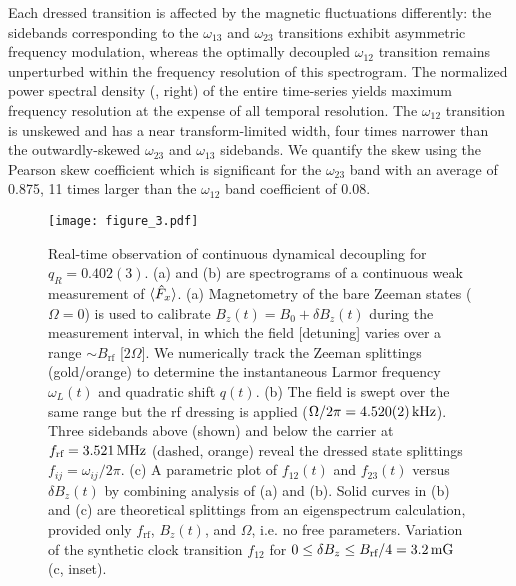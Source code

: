 \documentclass[aps,prl,reprint,superscriptaddress,floatfix]{revtex4-1}
\begin{document}
Each dressed transition is affected by the magnetic fluctuations differently: the sidebands corresponding to the $\omega_{13}$ and $\omega_{23}$ transitions exhibit asymmetric frequency modulation, whereas the optimally decoupled $\omega_{12}$ transition remains unperturbed within the frequency resolution of this spectrogram.
The normalized power spectral density (, right) of the entire time-series yields maximum frequency resolution at the expense of all temporal resolution.
The $\omega_{12}$ transition is unskewed and has a near transform-limited width, four times narrower than the outwardly-skewed $\omega_{23}$ and $\omega_{13}$ sidebands. We quantify the skew using the Pearson skew coefficient which is significant for the $\omega_{23}$ band with an average of 0.875, 11 times larger than the $\omega_{12}$ band coefficient of 0.08. 
\begin{figure}
    \texttt{[image: figure\_3.pdf]}
    \caption{
    \label{fig:acquisition_pipeline}
        Real-time observation of continuous dynamical decoupling for $q_R = 0.402(3)$.
        (a) and (b) are spectrograms of a continuous weak measurement of $\langle \hat{F}_x \rangle$.
        (a) Magnetometry of the bare Zeeman states ($\Omega=0$) is used to calibrate $B_z(t) = B_0 + \delta B_z(t)$ during the measurement interval, in which the field [detuning] varies over a range $\sim B_{\text{rf}}$ [$2\Omega$].
        We numerically track the Zeeman splittings (gold/orange) to determine the instantaneous Larmor frequency $\omega_L(t)$ and quadratic shift $q(t)$.
       (b) The field is swept over the same range but the rf dressing is applied ($\Omega/2\pi = \unit[4.520(2)]{kHz}$).
       Three sidebands above (shown) and below the carrier at $f_{\text{rf}}=\unit[3.521]{MHz}$ (dashed, orange) reveal the dressed state splittings $f_{ij} = \omega_{ij}/2\pi$.
       (c) A parametric plot of $f_{12}(t)$ and $f_{23}(t)$ versus $\delta B_z(t)$ by combining analysis of (a) and (b).
       Solid curves in (b) and (c) are theoretical splittings from an eigenspectrum calculation, provided only $f_{\text{rf}}$, $B_z(t)$, and $\Omega$, i.e. no free parameters.
       Variation of the synthetic clock transition $f_{12}$ for $0 \leq \delta B_z \leq B_{\text{rf}}/4 = \unit[3.2]{mG}$ (c, inset).
    }
\end{figure}
\end{document}
